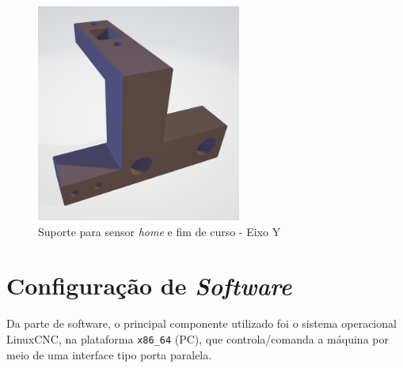 \documentclass[
	article,			%
	11pt,				%
	oneside,			%
	a4paper,			%
	section=TITLE,		%
	english,			%
	brazil,				%
	sumario=tradicional
	]{abntex2}
\newcommand{\LCNC}{LinuxCNC}
\begin{document}
\begin{figure}[H]
    \centering
    \includegraphics[width=0.6\textwidth]{img/duploy.png}
    \caption{Suporte para sensor \textit{home} e fim de curso - Eixo Y}
    \label{fig:duploy}
\end{figure}




\section{Configuração de \textit{Software}}

Da parte de software, o principal componente utilizado foi o sistema operacional \LCNC, na  plataforma \texttt{x86\_64} (PC), que controla/comanda a máquina por meio de uma interface tipo porta paralela.
\end{document}
